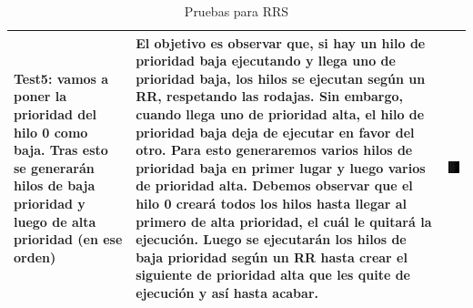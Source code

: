 \documentclass[10pt, spanish, pdftex]{template/UC3M_document}
\begin{document}
\begin{table}[h!]
\begin{tabular}{|C{0.15\textwidth}|C{0.4\textwidth}|C{0.35\textwidth}|}
    \textbf{Test5}: vamos a poner la prioridad del hilo 0 como baja. Tras esto se generarán hilos de baja prioridad y luego de alta prioridad (en ese orden) & El objetivo es observar que, si hay un hilo de prioridad baja ejecutando y llega uno de prioridad baja, los hilos se ejecutan según un RR, respetando las rodajas. Sin embargo, cuando llega uno de prioridad alta, el hilo de prioridad baja deja de ejecutar en favor del otro. Para esto generaremos varios hilos de prioridad baja en primer lugar y luego varios de prioridad alta. Debemos observar que el hilo 0 creará todos los hilos hasta llegar al primero de alta prioridad, el cuál le quitará la ejecución. Luego se ejecutarán los hilos de baja prioridad según un RR hasta crear el siguiente de prioridad alta que les quite de ejecución y así hasta acabar. & \includegraphics[width=5.9cm]{arboles/test5.png}
    \\ \hline
    \end{tabular}
    \caption{Pruebas para RRS}
    \label{fig:resultRRS}
\end{table}
\end{document}
